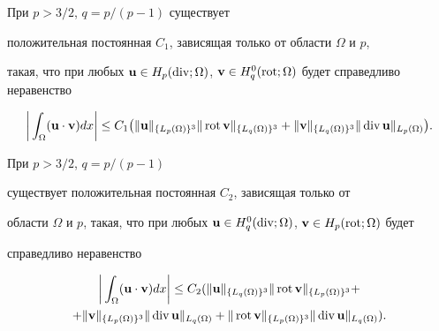 \begin{thms}\label{t1}


При ${p>3/2}$, ${q=p/(p-1)}$  существует


положительная постоянная $C_1$, зависящая только от области $\Omega$ и $p$,


такая, что при любых $\bold{u}\in H_p(\Div;\Omega)$, ${\bold{v}\in


H_q^0(\Rot;\Omega)}$ будет справедливо неравенство


\begin{equation}


\bigg|\int_{\Omega}(\bold{u}\cdot


\bold{v})dx\bigg| \leq C_1\big(\|\bold{u}\|_{\{ L_p(\Omega)\}^3}\| \Rot


\bold{v} \|_{\{ L_q(\Omega)\}^3}+\| \bold{v} \|_{\{ L_q(\Omega)\}^3}\|


\Div\bold{u} \|_{L_p(\Omega)}\big).


\label{o1}


\end{equation}


\end{thms}








\begin{thms}\label{t2}


При ${p>3/2}$, ${q=p/(p-1)}$


существует положительная постоянная $C_2$, зависящая только от


области $\Omega$ и $p$, такая, что при любых $\bold{u}\in


H_q^0(\Div;\Omega)$, ${\bold{v}\in H_p(\Rot;\Omega)}$ будет


справедливо неравенство


\begin{multline}


\bigg|\int_{\Omega}(\bold{u}\cdot\bold{v})dx\bigg| \leq


C_2(\| \bold{u} \|_{\{ L_q(\Omega)\}^3}\| \Rot\bold{v} \|


_{\{ L_p(\Omega)\}^3}+ \\


%


+\| \bold{v} \|_{\{ L_p(\Omega)\}^3}\|


\Div\bold{u} \|_{L_q(\Omega)}+\|\Rot\bold{v}


\|_{\{ L_p(\Omega)\}^3}\|\Div\bold{u} \|_{L_q(\Omega)}).


\label{o2}


\end{multline}


\end{thms}









